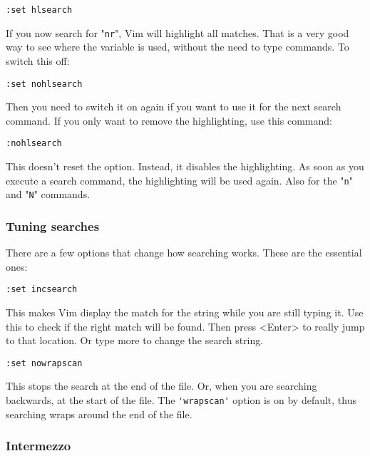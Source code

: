  \begin{Verbatim}[samepage=true]
 :set hlsearch
 \end{Verbatim}

If you now search for "\verb!nr!", Vim will highlight all matches.
That is a very good way to see where the variable is used, without the need to type commands.
To switch this off:

 \begin{Verbatim}[samepage=true]
 :set nohlsearch
 \end{Verbatim}

Then you need to switch it on again if you want to use it for the next search
command.  If you only want to remove the highlighting, use this command:

 \begin{Verbatim}[samepage=true]
 :nohlsearch
 \end{Verbatim}

This doesn't reset the option.
Instead, it disables the highlighting.
As soon as you execute a search command, the highlighting will be used again.
Also for the "\verb!n!" and "\verb!N!" commands.

\subsubsection{Tuning searches}

There are a few options that change how searching works.  These are the
essential ones:

 \begin{Verbatim}[samepage=true]
 :set incsearch
 \end{Verbatim}

This makes Vim display the match for the string while you are still typing it.
Use this to check if the right match will be found.
Then press <Enter> to really jump to that location.
Or type more to change the search string.

 \begin{Verbatim}[samepage=true]
 :set nowrapscan
 \end{Verbatim}

This stops the search at the end of the file.
Or, when you are searching backwards, at the start of the file.
The \verb!'wrapscan'! option is on by default, thus searching wraps around the end of the file.

\subsubsection{Intermezzo}

